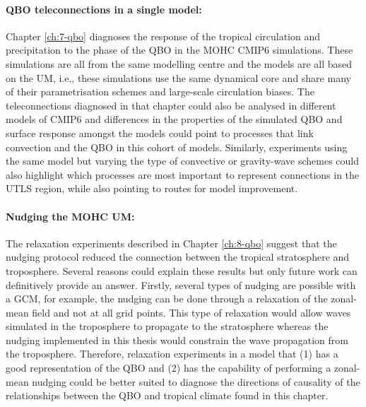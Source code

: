 \paragraph{QBO teleconnections in a single model:}
Chapter \ref{ch:7-qbo} diagnoses the response of the tropical circulation and precipitation to the phase of the QBO in the MOHC CMIP6 simulations. 
These simulations are all from the same modelling centre and the models are all based on the UM, i.e., these simulations use the same dynamical core and share many of their parametrisation schemes and large-scale circulation biases. 
The teleconnections diagnosed in that chapter could also be analysed in different models of CMIP6 and differences in the properties of the simulated QBO and surface response amongst the models could point to processes that link convection and the QBO in this cohort of models. 
Similarly, experiments using the same model but varying the type of convective or gravity-wave schemes could also highlight which processes are most important to represent connections in the UTLS region, while also pointing to routes for model improvement. 

\paragraph{Nudging the MOHC UM:} 
The relaxation experiments described in Chapter \ref{ch:8-qbo} suggest that the nudging protocol reduced the connection between the tropical stratosphere and troposphere. 
Several reasons could explain these results but only future work can definitively provide an answer. 
Firstly, several types of nudging are possible with a GCM, for example, the nudging can be done through a relaxation of the zonal-mean field and not at all grid points. 
This type of relaxation would allow waves simulated in the troposphere to propagate to the stratosphere whereas the nudging implemented in this thesis would constrain the wave propagation from the troposphere. 
Therefore, relaxation experiments in a model that (1) has a good representation of the QBO and (2) has the capability of performing a zonal-mean nudging could be better suited to diagnose the directions of causality of the relationships between the QBO and tropical climate found in this chapter.

 




